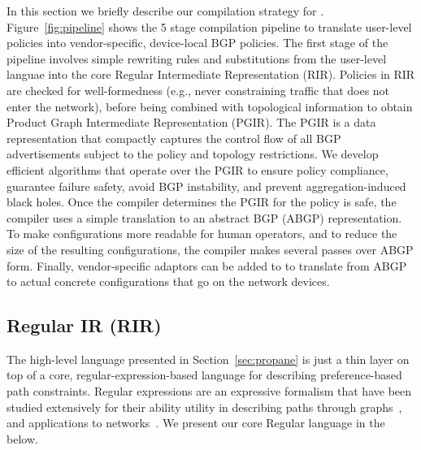 In this section we briefly describe our compilation strategy for \sysname. Figure~\ref{fig:pipeline} shows the 5 stage compilation pipeline to translate user-level \sysname policies into vendor-specific, device-local BGP policies. The first stage of the pipeline involves simple rewriting rules and substitutions from the user-level languae into the core Regular Intermediate Representation (RIR). Policies in RIR are checked for well-formedness (e.g., never constraining traffic that does not enter the network), before being combined with topological information to obtain Product Graph Intermediate Representation (PGIR). The PGIR is a data representation that compactly captures the control flow of all BGP advertisements subject to the policy and topology restrictions. We develop efficient algorithms that operate over the PGIR to ensure policy compliance, guarantee failure safety, avoid BGP instability, and prevent aggregation-induced black holes. Once the compiler determines the PGIR for the policy is safe, the compiler uses a simple translation to an abstract BGP (ABGP) representation. To make configurations more readable for human operators, and to reduce the size of the resulting configurations, the \sysname compiler makes several passes over ABGP form. Finally, vendor-specific adaptors can be added to \sysname to translate from ABGP to actual concrete configurations that go on the network devices.





\subsection{Regular IR (RIR)} 
\label{sec:rir}

The high-level language presented in Section~\ref{sec:propane} is just a thin layer on top of a core, regular-expression-based language for describing preference-based path constraints. Regular expressions are an expressive formalism that have been studied extensively for their ability utility in describing paths through graphs~\cite{bib:todo}, and applications to networks~\cite{bib:todo}. We present our core Regular language in the below.

\newcommand{\BNFALT}{\;\;|\;\;}
\newcommand{\hdr}[2]{\flushleft \chdr{#1}{#2}}
\newcommand{\chdr}[2]{\textbf{#1} {#2} \\ \centering}

